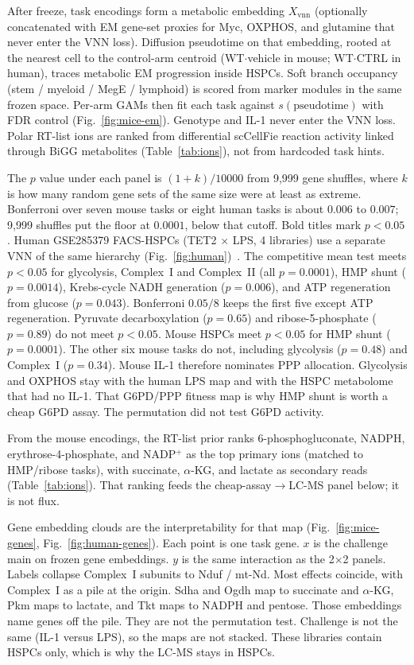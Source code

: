 \documentclass[11pt]{article}
\begin{document}
After freeze, task encodings form a metabolic embedding $X_{\mathrm{vnn}}$ (optionally
concatenated with EM gene-set proxies for Myc, OXPHOS, and glutamine that never enter
the VNN loss). Diffusion pseudotime on that embedding, rooted at the nearest cell to the
control-arm centroid (WT$\cdot$vehicle in mouse; WT$\cdot$CTRL in human), traces
metabolic EM progression inside HSPCs. Soft branch occupancy (stem / myeloid / MegE /
lymphoid) is scored from marker modules in the same frozen space. Per-arm GAMs then fit
each task against $s(\mathrm{pseudotime})$ with FDR control
(Fig.~\ref{fig:mice-em}). Genotype and IL-1 never enter the VNN loss. Polar RT-list ions
are ranked from differential scCellFie reaction activity linked through BiGG
metabolites (Table~\ref{tab:ions}), not from hardcoded task hints.

The $p$ value under each panel is $(1+k)/10000$ from 9{,}999 gene shuffles, where $k$ is
how many random gene sets of the same size were at least as extreme. Bonferroni over
seven mouse tasks or eight human tasks is about $0.006$ to $0.007$; 9{,}999 shuffles put
the floor at $0.0001$, below that cutoff. Bold titles mark $p<0.05$.
Human GSE285379 FACS-HSPCs (TET2 $\times$ LPS, 4 libraries) use a separate VNN of the
same hierarchy (Fig.~\ref{fig:human})~\cite{HuergaEncabo2023TET2neutrophil}. The
competitive mean test meets $p<0.05$ for glycolysis, Complex~I and Complex~II (all
$p=0.0001$), HMP shunt ($p=0.0014$), Krebs-cycle NADH generation ($p=0.006$), and ATP
regeneration from glucose ($p=0.043$). Bonferroni $0.05/8$ keeps the first five except
ATP regeneration. Pyruvate decarboxylation ($p=0.65$) and ribose-5-phosphate
($p=0.89$) do not meet $p<0.05$. Mouse HSPCs meet $p<0.05$ for HMP shunt ($p=0.0001$).
The other six mouse tasks do not, including glycolysis ($p=0.48$) and Complex~I
($p=0.34$). Mouse IL-1 therefore nominates PPP allocation. Glycolysis and OXPHOS stay
with the human LPS map and with the HSPC metabolome that had no IL-1. That G6PD/PPP
fitness map is why HMP shunt is worth a cheap G6PD assay. The permutation did not test
G6PD activity.

From the mouse encodings, the RT-list prior ranks 6-phosphogluconate, NADPH, erythrose-4-phosphate,
and NADP$^{+}$ as the top primary ions (matched to HMP/ribose tasks), with succinate,
$\alpha$-KG, and lactate as secondary reads (Table~\ref{tab:ions}). That ranking feeds
the cheap-assay$\to$LC-MS panel below; it is not flux.

Gene embedding clouds are the interpretability for that map (Fig.~\ref{fig:mice-genes},
Fig.~\ref{fig:human-genes}). Each point is one task gene. $x$ is the challenge main on
frozen gene embeddings. $y$ is the same interaction as the 2$\times$2 panels. Labels
collapse Complex~I subunits to Nduf / mt-Nd. Most effects coincide, with Complex~I as a
pile at the origin. Sdha and Ogdh map to succinate and $\alpha$-KG, Pkm maps to lactate,
and Tkt maps to NADPH and pentose. Those embeddings name genes off the pile. They are
not the permutation test. Challenge is not the same (IL-1 versus LPS), so the maps are not
stacked. These libraries contain HSPCs only, which is why the LC-MS stays in HSPCs.
\end{document}
